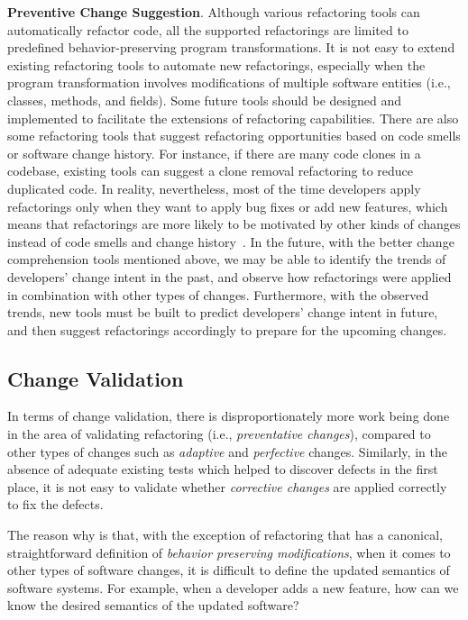 \textbf{Preventive Change Suggestion}.
Although various refactoring tools can automatically refactor code, all the supported refactorings are limited to predefined behavior-preserving program transformations. It is not easy to extend existing refactoring tools to automate new refactorings, especially when the program transformation involves modifications of multiple software entities (i.e., classes, methods, and fields). Some future tools should be designed and implemented to facilitate the extensions of refactoring capabilities.
There are also some refactoring tools that suggest refactoring opportunities based on code smells or software change history. For instance, if there are many code clones in a codebase, existing tools can suggest a clone removal refactoring to reduce duplicated code. In reality, nevertheless, most of the time developers apply refactorings only when they want to apply bug fixes or add new features, which means that refactorings are more likely to be motivated by other kinds of changes instead of code smells and change history~\cite{Silva2016:WWR}. In the future, with the better change comprehension tools mentioned above, we may be able to identify the trends of developers' change intent in the past, and observe how refactorings were applied in combination with other types of changes. Furthermore, with the observed trends, new tools must be built to predict developers' change intent in future, and then suggest refactorings accordingly to prepare for the upcoming changes.


\subsection{Change Validation}
In terms of change validation, there is disproportionately more work being done in the area of validating refactoring (i.e., {\em preventative changes}), compared to other types of changes such as {\em adaptive} and {\em perfective} changes. Similarly, in the absence of adequate existing tests which helped to discover defects in the first place, it is not easy to validate whether {\em corrective changes} are applied correctly to fix the defects. 

The reason why is that, with the exception of refactoring that has a canonical, straightforward definition of {\em behavior preserving modifications}, when it comes to other types of software changes, it is difficult to define the updated semantics of software systems. For example, when a developer adds a new feature, how can we know the desired semantics of the updated software?

